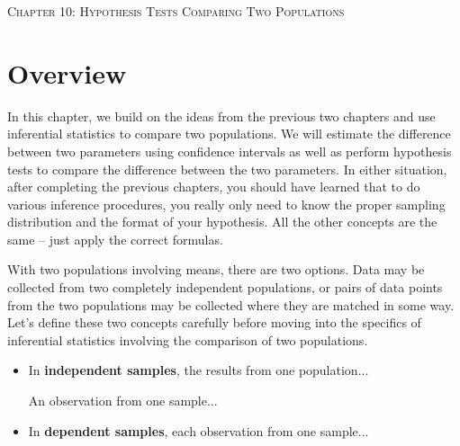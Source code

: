 \documentclass[12pt, letterpaper]{article}
\theoremstyle{definition}
\begin{document}


\begin{center}

{\LARGE \textsc{Chapter 10:  Hypothesis Tests Comparing Two Populations}}
\end{center}

\vspace*{-.3in}

\section*{Overview}

\vspace*{-.1in}

\noindent In this chapter, we build on the ideas from the previous two chapters and use inferential statistics to compare two populations.  We will estimate the difference between two parameters using confidence intervals as well as perform hypothesis tests to compare the difference between the two parameters.  In either situation, after completing the previous chapters, you should have learned that to do various inference procedures, you really only need to know the proper sampling distribution and the format of your hypothesis.  All the other concepts are the same -- just apply the correct formulas.

\vspace*{.1in}

\noindent With two populations involving means, there are two options.  Data may be collected from two completely independent populations, or pairs of data points from the two populations may be collected where they are matched in some way.  Let's define these two concepts carefully before moving into the specifics of inferential statistics involving the comparison of two populations.


\begin{itemize}

\item In \textbf{independent samples}, the results from one population...
\vspace*{.3in}

An observation from one sample...
\vspace*{.3in}

\item In \textbf{dependent samples}, each observation from one sample...
\vspace*{.2in}

\end{itemize}
\end{document}
